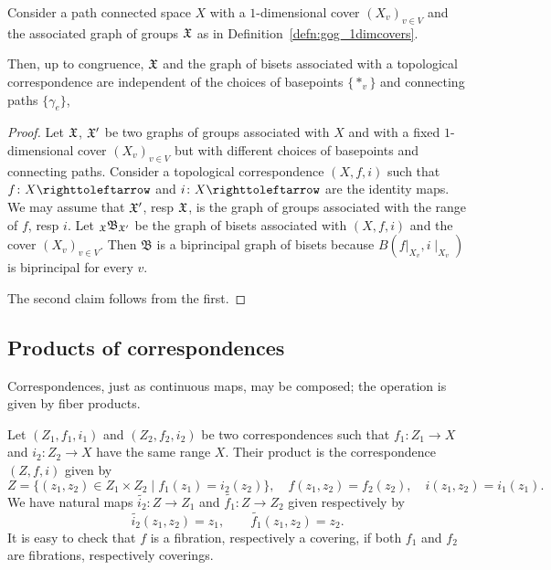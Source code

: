 \documentclass{amsart}
\begin{document}
\begin{lem}\label{lem:gfCongClass}
  Consider a path connected space $X$ with a $1$-dimensional cover
  $(X_v)_{v\in V}$ and the associated graph of groups ${\mathfrak X}$ as in
  Definition~\ref{defn:gog_1dimcovers}.

  Then, up to congruence, ${\mathfrak X}$ and the graph of bisets associated with a
  topological correspondence are independent of the choices of basepoints
  $\{*_v\}$ and connecting paths $\{\gamma_e\}$,
\end{lem}
\begin{proof}
  Let ${\mathfrak X}$, ${\mathfrak X}'$ be two graphs of groups associated with $X$ and
  with a fixed $1$-dimensional cover $(X_v)_{v\in V}$ but with
  different choices of basepoints and connecting paths. Consider a
  topological correspondence $(X,f,i)$ such that $f\colon X\selfmap$
  and $i\colon X\selfmap$ are the identity maps. We may assume that
  ${\mathfrak X}'$, resp ${\mathfrak X}$, is the graph of groups associated with the range
  of $f$, resp $i$. Let $_{{\mathfrak X}}\mathfrak B_{{\mathfrak X}'}$ be the graph of
  bisets associated with $(X,f,i)$ and the cover $(X_v)_{v\in
    V}$. Then $\mathfrak B$ is a biprincipal graph of bisets because
  $B(f|_{X_v}, i\mid_{X_v})$ is biprincipal for every $v$.

  The second claim follows from the first.
\end{proof}


\subsection{Products of correspondences}\label{ss:product_corr}
Correspondences, just as continuous maps, may be composed; the
operation is given by fiber products.

Let $(Z_1,f_1,i_1)$ and $(Z_2,f_2,i_2)$ be two correspondences such
that $f_1\colon Z_1\to X$ and $i_2\colon Z_2\to X$ have the same range $X$. Their
product is the correspondence $(Z,f,i)$ given by
\[Z=\{(z_1,z_2)\in Z_1\times Z_2\mid f_1(z_1)=i_2(z_2)\},\quad
f(z_1,z_2)=f_2(z_2),\quad i(z_1,z_2)=i_1(z_1).
\]
We have natural maps $\widetilde{i_2}\colon Z\to Z_1$ and
$\widetilde{f_1}\colon Z\to Z_2$ given respectively by
\[\widetilde{i_2}(z_1,z_2)=z_1,\qquad \widetilde{f_1}(z_1,z_2)=z_2.\]
It is easy to check that $f$ is a fibration, respectively a covering, if
both $f_1$ and $f_2$ are fibrations, respectively coverings.
\end{document}
